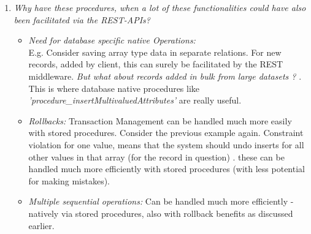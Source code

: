 \documentclass[conference]{IEEEtran}
\begin{document}
    \begin{enumerate}
        \item \textit{Why have these procedures, when a lot of these functionalities could have also been facilitated via the REST-APIs?}
            \begin{itemize}

                \item \textit{Need for database specific native Operations:}\\
                    E.g. Consider saving array type data in separate relations. For new records, added by client, this can surely be facilitated by the REST middleware.  \textit{But what about records added in bulk from large datasets ?}  \textrightarrow.  This is where database native procedures like \textit{'procedure\_insertMultivaluedAttributes'} are really useful.

		\vspace{0.5mm}

                \item \textit{Rollbacks:} Transaction Management can be handled much more easily with stored procedures. Consider the previous example again. Constraint violation for one value, means that the system should undo inserts for all other values in that array (for the record in question) \textrightarrow. these can be handled much more efficiently with stored procedures (with less potential for making mistakes).
                \vspace{1mm}
                \item \textit{Multiple sequential operations:} Can be handled much more efficiently - natively via stored procedures, also with rollback benefits as discussed earlier.
            \end{itemize}


\end{enumerate}
\end{document}
